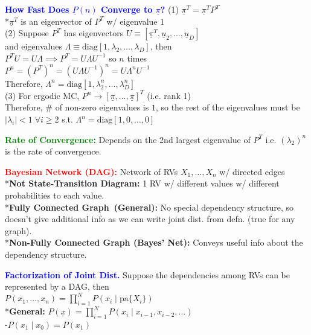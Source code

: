 \documentclass[5pt]{extarticle} %
\begin{document}
\begin{paracol}{3}
{    \textcolor{blue}{\textbf{How Fast Does $\underline{P}(n)$ Converge to $\underline{\pi}$?}} (1) $\underline{\pi}^T = \underline{\pi}^T P^T$ \\
    *$\underline{\pi}^T$ is an eigenvector of $P^T$ w/ eigenvalue $1$ \\
    (2) Suppose $P^T$ has eigenvectors $U \equiv [\underline{\pi}^T, \underline{u}_2, \ldots, \underline{u}_D]$ \\ 
    and eigenvalues $\Lambda \equiv \text{diag}[1, \lambda_2, \ldots, \lambda_D]$, then \\
    $P^T U = U \Lambda \implies P^T = U \Lambda U^{-1}$ so $n$ times \\
    $P^n = (P^T)^n = (U \Lambda U^{-1})^n = U \Lambda^n U^{-1}$ \\
    Therefore, $\Lambda^n = \text{diag}[1, \lambda_2^n, \ldots, \lambda_D^n]$ \\
    (3) For ergodic MC, $P^n \rightarrow [\underline{\pi}, \ldots, \underline{\pi}]^T$ (i.e. rank 1) \\
    Therefore, \# of non-zero eigenvalues is $1$, so the rest of the eigenvalues must be $|\lambda_i| < 1 \; \forall i \geq 2$ s.t. $\Lambda^n = \text{diag}[1,0,\ldots,0]$

    \textcolor{green}{\textbf{Rate of Convergence:}} Depends on the 2nd largest eigenvalue of $P^T$ i.e. $(\lambda_2)^n$ is the rate of convergence.

    \textcolor{red}{\textbf{Bayesian Network (DAG):}} Network of RVs $X_1,\ldots,X_n$ w/ directed edges \\ 
    *\textbf{Not State-Transition Diagram:} 1 RV w/ different values w/ different probabilities to each value. \\
    *\textbf{Fully Connected Graph (General):} No special dependency structure, so doesn't give additional info as we can write joint dist. from defn. (true for any graph). \\
    *\textbf{Non-Fully Connected Graph (Bayes' Net):} Conveys useful info about the dependency structure. 

    \textcolor{blue}{\textbf{Factorization of Joint Dist.}} Suppose the dependencies among RVs can be represented by a DAG, then \\
    $P(x_1,\ldots,x_n) = \prod_{i=1}^N P(x_i \mid \text{pa}\{X_i\})$ \\
    *\textbf{General:} $P(\underline{x}) = \prod_{i=1}^N P(x_i \mid x_{i-1},x_{i-2},\ldots)$ \\
    -$P(x_1 \mid x_0) = P(x_1)$

}
\end{paracol}
\end{document}
